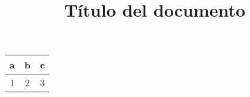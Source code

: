 \documentclass{article} %
\title{Título del documento}
\begin{document}
    \maketitle %
    

\begin{tabular}{c | c | c}
\hline
	a & b & c \\
	\hline
	1 & 2 & 3 \\
\end{tabular}
\end{document}
